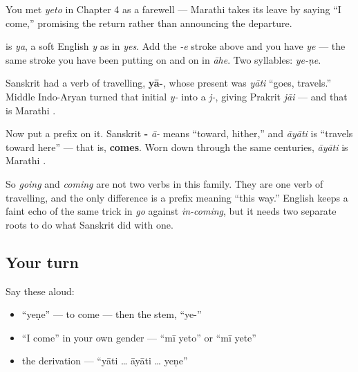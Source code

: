You met \emph{yeto} in Chapter 4 as a farewell — Marathi takes its leave by saying \textquotedblleft{}I come,\textquotedblright{} promising the return rather than announcing the departure.

\begin{sounds}
\textbf{} is \emph{ya}, a soft English \emph{y} as in \emph{yes}. Add the \emph{-e} stroke above and you have \textbf{} \emph{ye} — the same stroke you have been putting on \textbf{} and on \textbf{} in \emph{āhe}. Two syllables: \emph{ye-ṇe}.
\end{sounds}

\begin{cousinweb}
Sanskrit had a verb of travelling, \textbf{yā-}, whose present was \textbf{} \emph{yāti} \textquotedblleft{}goes, travels.\textquotedblright{} Middle Indo-Aryan turned that initial \emph{y-} into a \emph{j-}, giving Prakrit \emph{jāi} — and that is Marathi \textbf{}.

Now put a prefix on it. Sanskrit \textbf{-} \emph{ā-} means \textquotedblleft{}toward, hither,\textquotedblright{} and \textbf{} \emph{āyāti} is \textquotedblleft{}travels toward here\textquotedblright{} — that is, \textbf{comes}. Worn down through the same centuries, \emph{āyāti} is Marathi \textbf{}.

So \emph{going} and \emph{coming} are not two verbs in this family. They are one verb of travelling, and the only difference is a prefix meaning \textquotedblleft{}this way.\textquotedblright{} English keeps a faint echo of the same trick in \emph{go} against \emph{in-coming}, but it needs two separate roots to do what Sanskrit did with one.
\end{cousinweb}

\subsection*{Your turn}
Say these aloud:

\begin{itemize}
\raggedright
  \item \textquotedblleft{}yeṇe\textquotedblright{} — to come — then the stem, \textquotedblleft{}ye-\textquotedblright{}
  \item \textquotedblleft{}I come\textquotedblright{} in your own gender — \textquotedblleft{}mī yeto\textquotedblright{} or \textquotedblleft{}mī yete\textquotedblright{}
  \item the derivation — \textquotedblleft{}yāti … āyāti … yeṇe\textquotedblright{}
\end{itemize}

